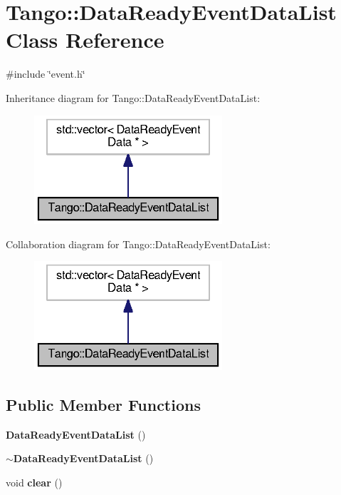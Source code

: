 \section{Tango\-:\-:Data\-Ready\-Event\-Data\-List Class Reference}
\label{classTango_1_1DataReadyEventDataList}


{\ttfamily \#include \char`\"{}event.\-h\char`\"{}}



Inheritance diagram for Tango\-:\-:Data\-Ready\-Event\-Data\-List\-:
\nopagebreak
\begin{figure}[H]
\begin{center}
\leavevmode
\includegraphics[width=198pt]{de/df9/classTango_1_1DataReadyEventDataList__inherit__graph}
\end{center}
\end{figure}


Collaboration diagram for Tango\-:\-:Data\-Ready\-Event\-Data\-List\-:
\nopagebreak
\begin{figure}[H]
\begin{center}
\leavevmode
\includegraphics[width=198pt]{d9/d8f/classTango_1_1DataReadyEventDataList__coll__graph}
\end{center}
\end{figure}
\subsection*{Public Member Functions}
\begin{DoxyCompactItemize}
\item 
{\bf Data\-Ready\-Event\-Data\-List} ()
\item 
{\bf $\sim$\-Data\-Ready\-Event\-Data\-List} ()
\item 
void {\bf clear} ()
\end{DoxyCompactItemize}


